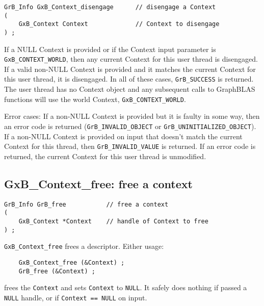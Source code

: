 \documentclass[12pt]{article}
\begin{document}
\begin{mdframed}[userdefinedwidth=6in]
{\footnotesize
\begin{verbatim}
GrB_Info GxB_Context_disengage      // disengage a Context
(
    GxB_Context Context             // Context to disengage
) ;
\end{verbatim} } \end{mdframed}

If a NULL Context is provided or if the Context input parameter is
\verb'GxB_CONTEXT_WORLD', then any current Context for this user thread is
disengaged.  If a valid non-NULL Context is provided and it matches the
current Context for this user thread, it is disengaged.  In all of these
cases, \verb'GrB_SUCCESS' is returned.  The user thread has no Context object and
any subsequent calls to GraphBLAS functions will use the world Context,
\verb'GxB_CONTEXT_WORLD'.

Error cases: If a non-NULL Context is provided but it is faulty in some way,
then an error code is returned (\verb'GrB_INVALID_OBJECT' or
\verb'GrB_UNINITIALIZED_OBJECT').  If a non-NULL Context is provided on input
that doesn't match the current Context for this thread, then
\verb'GrB_INVALID_VALUE' is returned.  If an error code is returned, the
current Context for this user thread is unmodified.

\subsection{{\sf GxB\_Context\_free:} free a context}
\label{context_free}

\begin{mdframed}[userdefinedwidth=6in]
{\footnotesize
\begin{verbatim}
GrB_Info GrB_free           // free a context
(
    GxB_Context *Context    // handle of Context to free
) ;
\end{verbatim} } \end{mdframed}

\verb'GxB_Context_free' frees a descriptor.
Either usage:

    {\small
    \begin{verbatim}
    GxB_Context_free (&Context) ;
    GrB_free (&Context) ; \end{verbatim}}

\noindent
frees the \verb'Context' and sets \verb'Context' to \verb'NULL'.  It
safely does nothing if passed a \verb'NULL' handle, or if
\verb'Context == NULL' on input.
\end{document}
